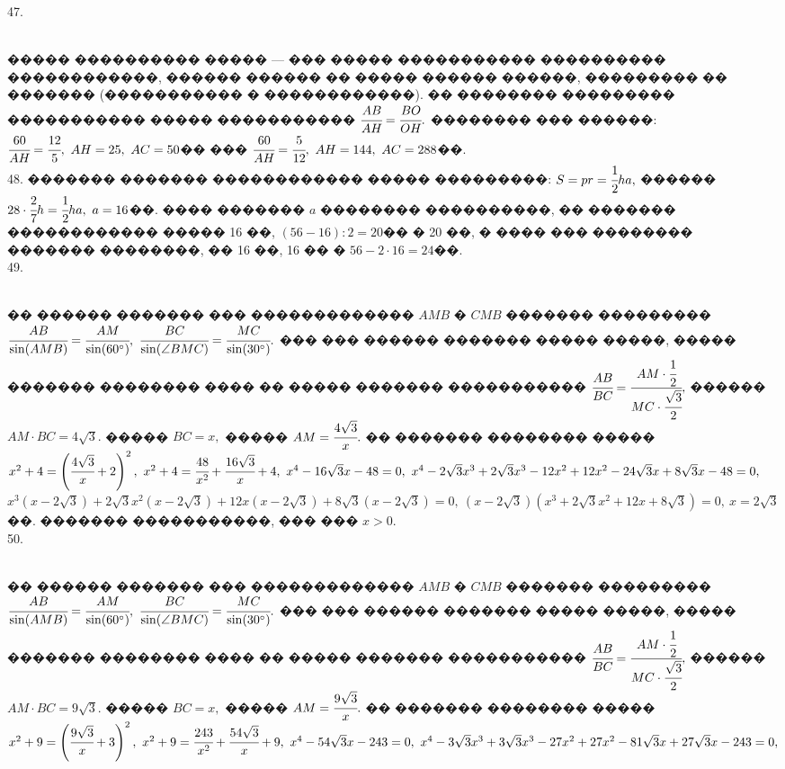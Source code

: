 \documentclass[12pt]{article}
\begin{document}
47. \begin{figure}[ht!]
\end{figure}\\
����� ���������� ����� --- ��� ����� ����������� ���������� ������������, ������ ������ �� ����� ������ ������, ��������� �� ������� (����������� � ������������). �� �������� ��������� ����������� ����� ����������� $\cfrac{AB}{AH}=\cfrac{BO}{OH}.$ �������� ��� ������: $\cfrac{60}{AH}=\cfrac{12}{5},\ AH=25,\ AC=50$�� ���
$\cfrac{60}{AH}=\cfrac{5}{12},\ AH=144,\ AC=288$��.\\
48. ������� ������� ������������ ����� ���������: $S=pr=\cfrac{1}{2}ha,$ ������ $28\cdot\cfrac{2}{7}h=\cfrac{1}{2}ha,\ a=16$��. ���� ������� $a$ �������� ����������, �� ������� ������������ ����� 16 ��, $(56-16):2=20$�� � 20 ��, � ���� ��� �������� ������� ��������, �� 16 ��, 16 �� � $56-2\cdot16=24$��.\\
49. \begin{figure}[ht!]
\end{figure}\\
�� ������ ������� ��� ������������� $AMB$ � $CMB$ ������� ���������\\ $\cfrac{AB}{\sin(AMB)}=\cfrac{AM}{\sin(60^\circ)},\ \cfrac{BC}{\sin(\angle BMC)}= \cfrac{MC}{\sin(30^\circ)}.$ ��� ��� ������ ������� ����� �����, ����� ������� �������� ���� �� ����� ������� ����������� $\cfrac{AB}{BC}=\cfrac{AM\cdot\cfrac{1}{2}}{MC\cdot\cfrac{\sqrt{3}}{2}},$ ������ $AM\cdot BC=4\sqrt{3}.$ ����� $BC=x,$ ����� $AM=\cfrac{4\sqrt{3}}{x}.$ �� ������� �������� ����� $x^2+4=\left(\cfrac{4\sqrt{3}}{x}+2\right)^2,\ x^2+4=\cfrac{48}{x^2}+\cfrac{16\sqrt{3}}{x}+4,\ x^4-16\sqrt{3}x-48=0,\ x^4-2\sqrt{3}x^3+2\sqrt{3}x^3-12x^2+12x^2-24\sqrt{3}x+8\sqrt{3}x-48=0,$\\
$x^3(x-2\sqrt{3})+2\sqrt{3}x^2(x-2\sqrt{3})+12x(x-2\sqrt{3})+8\sqrt{3}(x-2\sqrt{3})=0,\ (x-2\sqrt{3})(x^3+2\sqrt{3}x^2+12x+8\sqrt{3})=0,\ x=2\sqrt{3}$��. ������� �����������, ��� ��� $x>0.$\\
50. \begin{figure}[ht!]
\end{figure}\\
�� ������ ������� ��� ������������� $AMB$ � $CMB$ ������� ���������\\ $\cfrac{AB}{\sin(AMB)}=\cfrac{AM}{\sin(60^\circ)},\ \cfrac{BC}{\sin(\angle BMC)}= \cfrac{MC}{\sin(30^\circ)}.$ ��� ��� ������ ������� ����� �����, ����� ������� �������� ���� �� ����� ������� ����������� $\cfrac{AB}{BC}=\cfrac{AM\cdot\cfrac{1}{2}}{MC\cdot\cfrac{\sqrt{3}}{2}},$ ������ $AM\cdot BC=9\sqrt{3}.$ ����� $BC=x,$ ����� $AM=\cfrac{9\sqrt{3}}{x}.$ �� ������� �������� ����� $x^2+9=\left(\cfrac{9\sqrt{3}}{x}+3\right)^2,\ x^2+9=\cfrac{243}{x^2}+\cfrac{54\sqrt{3}}{x}+9,\ x^4-54\sqrt{3}x-243=0,\ x^4-3\sqrt{3}x^3+3\sqrt{3}x^3-27x^2+27x^2-81\sqrt{3}x+27\sqrt{3}x-243=0,$\\
\end{document}
